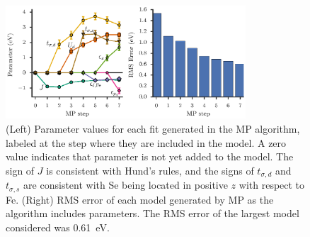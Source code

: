 \begin{figure}
  \centering
  \includegraphics[width=0.8\textwidth]{./Figures/fese.eps}
  \caption{
    \label{fig:fese} 
    (Left) Parameter values for each fit generated in the MP algorithm, labeled at the step where they are included in the model. 
    A zero value indicates that parameter is not yet added to the model.
    The sign of $J$ is consistent with Hund's rules, and the signs of $t_{\sigma,d}$ and $t_{\sigma,s}$ are consistent with Se being located in positive $z$ with respect to Fe. 
    (Right) RMS error of each model generated by MP as the algorithm includes parameters. 
    The RMS error of the largest model considered was 0.61~eV.
  }
\end{figure}



